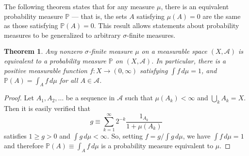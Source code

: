 \documentclass[12pt]{article}
\newtheorem*{theorem*}{Theorem}
\begin{document}
The following theorem states that for any  measure $\mu$, there is an equivalent probability measure $\mathbb{P}$ --- that is, the sets $A$ satisfying $\mu(A)=0$ are the same as those satisfying $\mathbb{P}(A)=0$.
This result allows statements about probability measures to be generalized to arbitrary $\sigma$-finite measures.

\begin{theorem*}
Any nonzero $\sigma$-finite measure $\mu$ on a measurable space $(X,\mathcal{A})$ is equivalent to a probability measure $\mathbb{P}$ on $(X,\mathcal{A})$. In particular, there is a positive measurable function $f\colon X\rightarrow(0,\infty)$ satisfying $\int f\,d\mu=1$, and $\mathbb{P}(A)=\int_Af\,d\mu$ for all $A\in\mathcal{A}$.
\end{theorem*}
\begin{proof}
Let $A_1,A_2,\ldots$ be a sequence in $\mathcal{A}$ such that $\mu(A_k)<\infty$ and $\bigcup_kA_k=X$. Then it is easily verified that
\begin{equation*}
g\equiv\sum_{k=1}^\infty 2^{-k}\frac{1_{A_k}}{1+\mu(A_k)}
\end{equation*}
satisfies $1\ge g>0$ and $\int g\,d\mu<\infty$. So, setting $f=g/\int g\,d\mu$, we have $\int f\,d\mu=1$ and therefore $\mathbb{P}(A)\equiv\int_Af\,d\mu$ is a probability measure equivalent to $\mu$.
\end{proof}
\end{document}
